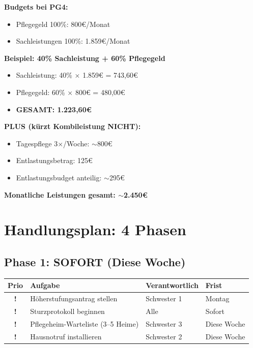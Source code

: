 \documentclass[11pt,a4paper]{article}
\begin{document}
\begin{graybox}
\textbf{Budgets bei PG4:}
\begin{itemize}[noitemsep]
    \item Pflegegeld 100\%: 800\euro{}/Monat
    \item Sachleistungen 100\%: 1.859\euro{}/Monat
\end{itemize}

\vspace{0.3cm}
\textbf{Beispiel: 40\% Sachleistung + 60\% Pflegegeld}
\begin{itemize}[noitemsep]
    \item Sachleistung: 40\% $\times$ 1.859\euro{} = 743,60\euro{}
    \item Pflegegeld: 60\% $\times$ 800\euro{} = 480,00\euro{}
    \item \textbf{GESAMT: 1.223,60\euro{}}
\end{itemize}

\vspace{0.3cm}
\textbf{PLUS (kürzt Kombileistung NICHT):}
\begin{itemize}[noitemsep]
    \item Tagespflege 3$\times$/Woche: $\sim$800\euro{}
    \item Entlastungsbetrag: 125\euro{}
    \item Entlastungsbudget anteilig: $\sim$295\euro{}
\end{itemize}

\textbf{Monatliche Leistungen gesamt: $\sim$2.450\euro{}}
\end{graybox}

\section{Handlungsplan: 4 Phasen}

\subsection{Phase 1: SOFORT (Diese Woche)}

\begin{center}
\begin{tabular}{clll}
\toprule
\textbf{Prio} & \textbf{Aufgabe} & \textbf{Verantwortlich} & \textbf{Frist} \\
\midrule
\textcolor{dangerred}{\textbf{!}} & Höherstufungsantrag stellen & Schwester 1 & Montag \\
\textcolor{dangerred}{\textbf{!}} & Sturzprotokoll beginnen & Alle & Sofort \\
\textcolor{warningorange}{\textbf{!}} & Pflegeheim-Warteliste (3--5 Heime) & Schwester 3 & Diese Woche \\
\textcolor{warningorange}{\textbf{!}} & Hausnotruf installieren & Schwester 2 & Diese Woche \\
\bottomrule
\end{tabular}
\end{center}
\end{document}
